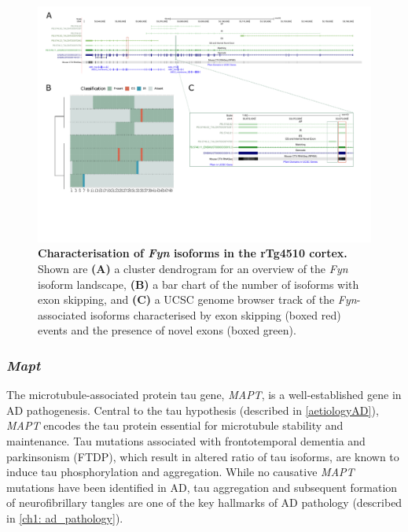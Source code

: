 \begin{landscape}
	\begin{figure}[htp]
		\centering
		\captionsetup{width=1.3\textwidth}
		\includegraphics[page=7,trim={0 1cm 0 0},scale = 0.85]{Figures/TargetGenes_Annotation_Landscape.pdf}
		\caption[Characterisation of the \textit{Fyn} isoform landscape]%
		{\textbf{Characterisation of \textit{Fyn} isoforms in the rTg4510 cortex.} Shown are \textbf{(A)} a cluster dendrogram for an overview of the \textit{Fyn} isoform landscape, \textbf{(B)} a bar chart of the number of isoforms with exon skipping, and \textbf{(C)} a UCSC genome browser track of the \textit{Fyn}-associated isoforms characterised by exon skipping (boxed red) events and the presence of novel exons (boxed green).}    
		\label{fig:fyn}
	\end{figure}
\end{landscape}
\restoregeometry

\newpage
\subsubsection{\textit{Mapt}}
The microtubule-associated protein tau gene, \textit{MAPT}, is a well-established gene in AD pathogenesis. Central to the tau hypothesis (described in \cref{aetiologyAD}), \textit{MAPT} encodes the tau protein essential for microtubule stability and maintenance. Tau mutations associated with frontotemporal dementia and parkinsonism (FTDP), which result in altered ratio of tau isoforms, are known to induce tau phosphorylation and aggregation\cite{Bowles2022}. While no causative \textit{MAPT} mutations have been identified in AD, tau aggregation and subsequent formation of neurofibrillary tangles are one of the key hallmarks of AD pathology (described in \cref{ch1: ad_pathology}). 

